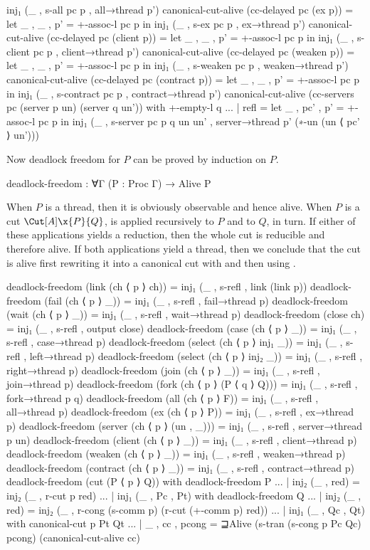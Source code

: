 \begin{code}[hide]
  inj₁ (_ , s-all pc p , all→thread p')
canonical-cut-alive (cc-delayed pc (ex p)) =
  let _ , _ , p' = +-assoc-l pc p in
  inj₁ (_ , s-ex pc p , ex→thread p')
canonical-cut-alive (cc-delayed pc (client p)) =
  let _ , _ , p' = +-assoc-l pc p in
  inj₁ (_ , s-client pc p , client→thread p')
canonical-cut-alive (cc-delayed pc (weaken p)) =
  let _ , _ , p' = +-assoc-l pc p in
  inj₁ (_ , s-weaken pc p , weaken→thread p')
canonical-cut-alive (cc-delayed pc (contract p)) =
  let _ , _ , p' = +-assoc-l pc p in
  inj₁ (_ , s-contract pc p , contract→thread p')
canonical-cut-alive (cc-servers pc (server p un) (server q un')) with +-empty-l q
... | refl =
  let _ , pc' , p' = +-assoc-l pc p in
  inj₁ (_ , s-server pc p q un un' , server→thread p' (∗-un (un ⟨ pc' ⟩ un')))
\end{code}

Now deadlock freedom for $P$ can be proved by induction on $P$.

\begin{code}
deadlock-freedom : ∀{Γ} (P : Proc Γ) → Alive P
\end{code}

When $P$ is a thread, then it is obviously observable and hence alive. When $P$
is a cut $\Cut[A]\x{P}{Q}$,  is applied
recursively to $P$ and to $Q$, in turn. If either of these applications yields a
reduction, then the whole cut is reducible and therefore alive. If both
applications yield a thread, then we conclude that the cut is alive first
rewriting it into a canonical cut with  and then
using .

\begin{code}[hide]
deadlock-freedom (link (ch ⟨ p ⟩ ch)) = inj₁ (_ , s-refl , link (link p))
deadlock-freedom (fail (ch ⟨ p ⟩ _)) = inj₁ (_ , s-refl , fail→thread p)
deadlock-freedom (wait (ch ⟨ p ⟩ _)) = inj₁ (_ , s-refl , wait→thread p)
deadlock-freedom (close ch) = inj₁ (_ , s-refl , output close)
deadlock-freedom (case (ch ⟨ p ⟩ _)) = inj₁ (_ , s-refl , case→thread p)
deadlock-freedom (select (ch ⟨ p ⟩ inj₁ _)) = inj₁ (_ , s-refl , left→thread p)
deadlock-freedom (select (ch ⟨ p ⟩ inj₂ _)) = inj₁ (_ , s-refl , right→thread p)
deadlock-freedom (join (ch ⟨ p ⟩ _)) = inj₁ (_ , s-refl , join→thread p)
deadlock-freedom (fork (ch ⟨ p ⟩ (P ⟨ q ⟩ Q))) = inj₁ (_ , s-refl , fork→thread p q)
deadlock-freedom (all (ch ⟨ p ⟩ F)) = inj₁ (_ , s-refl , all→thread p)
deadlock-freedom (ex (ch ⟨ p ⟩ P)) = inj₁ (_ , s-refl , ex→thread p)
deadlock-freedom (server (ch ⟨ p ⟩ (un , _))) = inj₁ (_ , s-refl , server→thread p un)
deadlock-freedom (client (ch ⟨ p ⟩ _)) = inj₁ (_ , s-refl , client→thread p)
deadlock-freedom (weaken (ch ⟨ p ⟩ _)) = inj₁ (_ , s-refl , weaken→thread p)
deadlock-freedom (contract (ch ⟨ p ⟩ _)) = inj₁ (_ , s-refl , contract→thread p)
deadlock-freedom (cut (P ⟨ p ⟩ Q)) with deadlock-freedom P
... | inj₂ (_ , red) = inj₂ (_ , r-cut p red)
... | inj₁ (_ , Pc , Pt) with deadlock-freedom Q
... | inj₂ (_ , red) = inj₂ (_ , r-cong (s-comm p) (r-cut (+-comm p) red))
... | inj₁ (_ , Qc , Qt) with canonical-cut p Pt Qt
... | _ , cc , pcong = ⊒Alive (s-tran (s-cong p Pc Qc) pcong) (canonical-cut-alive cc)
\end{code}

